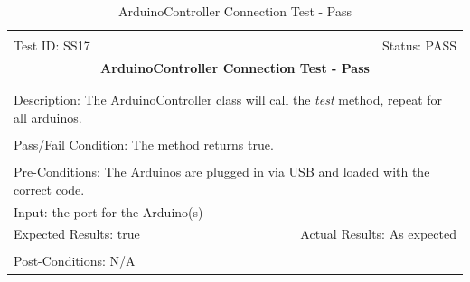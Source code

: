 \documentclass[11pt]{article}
\begin{document}
\begin{center}
\begin{table}[H]
\begin{tabular}{|l r|}\hline&\\[-2mm]
	Test ID: SS17	&Status: PASS\\[-3mm]
	\multicolumn{2}{|c|}{\textbf{\large{ArduinoController Connection Test - Pass}}}\\&\\\hline&\\[-3mm]
	\multicolumn{2}{|p{\textwidth}|}{Description: The ArduinoController class will call the \textit{test} method, repeat for all arduinos.}\\[1mm]\hline&\\[-3mm]
	\multicolumn{2}{|p{\textwidth}|}{Pass/Fail Condition: The method returns true.}\\[1mm]\hline&\\[-3mm]
	\multicolumn{2}{|p{\textwidth}|}{Pre-Conditions: The Arduinos are plugged in via USB and loaded with the correct code.}\\[4mm]
	\multicolumn{2}{|p{\textwidth}|}{Input: the port for the Arduino(s)}\\[2mm]\hline
	\multicolumn{1}{|p{0.49\textwidth}}{Expected Results: true}	&\multicolumn{1}{|p{0.45\textwidth}|}{Actual Results: As expected}\\\hline&\\[-3mm]
	\multicolumn{2}{|p{\textwidth}|}{Post-Conditions: N/A}\\\hline
\end{tabular}
\caption{ArduinoController Connection Test - Pass}
\end{table}
\end{center}
\end{document}
